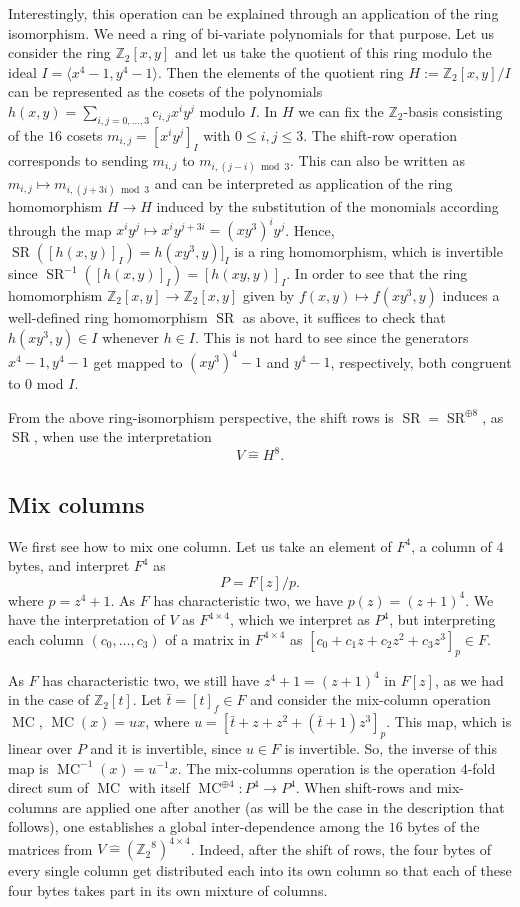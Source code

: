 \documentclass[11pt,a4paper]{amsart}
\newcommand{\SR}{\operatorname{SR}}
\newcommand{\MC}{\operatorname{MC}}
\newcommand{\Z}{\mathbb{Z}}
\begin{document}
Interestingly, this operation can be explained through an application of the ring isomorphism. We need a ring of bi-variate polynomials for that purpose. Let us consider the ring $\Z_2[ x, y]$ and let us take the quotient of this ring modulo the ideal $I= \langle x^4 -1 , y^4 - 1\rangle$. Then the elements of the quotient ring $H := \Z_2[x,y ] / I$ can be represented as the cosets of  the polynomials $h (x,y) = \sum_{i,j=0,\ldots,3 } c_{i,j} x^i y^j$ modulo $I$. In $H$ we can fix the $\Z_2$-basis consisting of the $16$ cosets $m_{i,j} = [ x^i y^j]_I$ with $0 \le i,j \le 3$. The shift-row operation corresponds to sending $m_{i,j}$ to $m_{i,(j-i) \bmod 3}$. This can also be written as $m_{i,j} \mapsto m_{i, (j+ 3 i) \bmod 3}$ and can be interpreted as application of the ring homomorphism $H \to H$ induced by the substitution of the monomials according through the map $x^i y^j \mapsto x^i y^{j+3 i} = (xy^3)^i y^j$. Hence, $\SR( [ h(x,y) ]_I) = h(x y^3, y) ]_I$ is a ring homomorphism, which is invertible since $\SR^{-1} ( [ h(x,y) ]_I) =[ h (x y, y) ]_I$. In order to see that the ring homomorphism $\Z_2[x,y] \to \Z_2[x,y]$ given by $f(x,y) \mapsto f(x y^3, y)$ induces a well-defined ring homomorphism $\SR$ as above, it suffices to check that $h(x y^3, y) \in I$ whenever $h \in I$. This is not hard to see since the generators $x^4 - 1, y^4 -1$ get mapped to $(x y^3)^4-1$ and $y^4 -1$, respectively, both congruent to $0$ mod $I$. 

From the above ring-isomorphism perspective, the shift rows is $\SR = \SR^{\oplus 8}$, as $\SR$, when use the interpretation 
\[
	V \hat{=} H^8.
\] 

\subsection*{Mix columns} We first see how to mix one column. Let us take an element of $F^4$, a column of $4$ bytes, and interpret $F^4$ as 
\[
	P = F[z] / p. 
\]
where $p = z^4 +1$. As $F$ has characteristic two, we have $p(z) = (z+1)^4. $ We have the interpretation of $V$ as $F^{4 \times 4}$, which we interpret as $P^4$, but interpreting each column $(c_0,\ldots,c_3)$ of a matrix in $F^{4 \times 4}$ as $[ c_0 + c_1 z + c_2 z^2 + c_3 z^3]_p \in F$. 

As $F$ has characteristic two, we still have $z^4 + 1 = (z+1)^4$ in $F[z]$, as we had in the case of $\Z_2[t]$. Let $\bar{t} = [t]_f \in F$ and consider the mix-column operation $\MC$, $\MC(x) = u x$, where $u = [\bar{t} + z + z^2 + (\bar{t} + 1) z^3]_p$. This map, which is linear over $P$ and it is invertible, since $u \in F$ is invertible. So, the inverse of this map is $\MC^{-1}(x) = u^{-1} x$. The mix-columns operation is the operation $4$-fold direct sum of $\MC$ with itself $\MC^{\oplus 4} : P^4 \to P^4$. When shift-rows and mix-columns are applied one after another (as will be the case in the description that follows), one establishes a global inter-dependence among the $16$ bytes of the matrices from $V \hat{=} ( {\Z_2}^8)^{4 \times 4}$. Indeed, after the shift of rows, the four bytes of every single column get distributed each into its own column so that each of these four bytes takes part in its own mixture of columns. 
\end{document}
